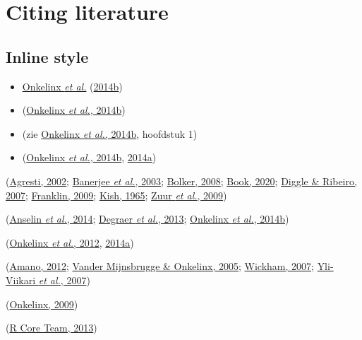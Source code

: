 \documentclass[twoside]{extreport}
\begin{document}
\hypertarget{citing-literature}{%
\chapter{Citing literature}\label{citing-literature}}

\hypertarget{inline-style}{%
\section{Inline style}\label{inline-style}}

\begin{itemize}
\tightlist
\item
  \protect\hyperlink{ref-BlauwdrukVleermuizen}{Onkelinx \emph{et al.}}
  (\protect\hyperlink{ref-BlauwdrukVleermuizen}{2014b})
\item
  (\protect\hyperlink{ref-BlauwdrukVleermuizen}{Onkelinx \emph{et al.},
  2014b})
\item
  (zie \protect\hyperlink{ref-BlauwdrukVleermuizen}{Onkelinx \emph{et
  al.}, 2014b}, hoofdstuk 1)
\item
  (\protect\hyperlink{ref-BlauwdrukVleermuizen}{Onkelinx \emph{et al.},
  2014b}, \protect\hyperlink{ref-Onkelinx2014a}{2014a})
\end{itemize}

\begin{description}
\tightlist
\item[book]
(\protect\hyperlink{ref-Agresti2002}{Agresti, 2002};
\protect\hyperlink{ref-BanerjeeEtal2003}{Banerjee \emph{et al.}, 2003};
\protect\hyperlink{ref-Bolker2008}{Bolker, 2008};
\protect\hyperlink{ref-book-a1e0}{Book, 2020};
\protect\hyperlink{ref-DiggleRibeiro2007}{Diggle \& Ribeiro, 2007};
\protect\hyperlink{ref-franklin_mapping_2009}{Franklin, 2009};
\protect\hyperlink{ref-Kish_1965}{Kish, 1965};
\protect\hyperlink{ref-ZuurEtal2009}{Zuur \emph{et al.}, 2009})
\item[chapter]
(\protect\hyperlink{ref-BlauwdrukVogels}{Anselin \emph{et al.}, 2014};
\protect\hyperlink{ref-Degraer2013a}{Degraer \emph{et al.}, 2013};
\protect\hyperlink{ref-BlauwdrukVleermuizen}{Onkelinx \emph{et al.},
2014b})
\item[proceedings]
(\protect\hyperlink{ref-Onkelinx2012}{Onkelinx \emph{et al.}, 2012},
\protect\hyperlink{ref-Onkelinx2014a}{2014a})
\item[article]
(\protect\hyperlink{ref-Amano2012}{Amano, 2012};
\protect\hyperlink{ref-VanderMijnsbrugge2005}{Vander Mijnsbrugge \&
Onkelinx, 2005}; \protect\hyperlink{ref-R-reshape}{Wickham, 2007};
\protect\hyperlink{ref-Yli-Viikari2007}{Yli-Viikari \emph{et al.},
2007})
\item[thesis]
(\protect\hyperlink{ref-MaStatThesis}{Onkelinx, 2009})
\item[software]
(\protect\hyperlink{ref-R-3.0.1}{R Core Team, 2013})
\end{description}
\end{document}
